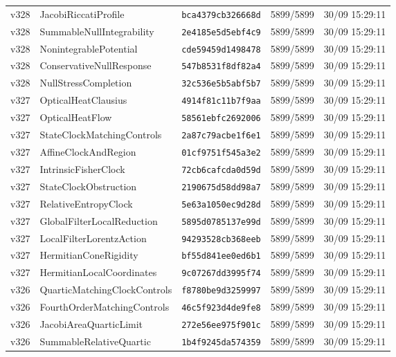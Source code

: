 \documentclass[11pt]{article}
\theoremstyle{definition}\newtheorem{deriv}{Derivação}
\begin{document}
{\begin{longtable}{@{}lllll@{}}
v328 & JacobiRiccatiProfile & \texttt{bca4379cb326668d} & 5899/5899 & 30/09 15:29:11 \\
v328 & SummableNullIntegrability & \texttt{2e4185e5d5ebf4c9} & 5899/5899 & 30/09 15:29:11 \\
v328 & NonintegrablePotential & \texttt{cde59459d1498478} & 5899/5899 & 30/09 15:29:11 \\
v328 & ConservativeNullResponse & \texttt{547b8531f8df82a4} & 5899/5899 & 30/09 15:29:11 \\
v328 & NullStressCompletion & \texttt{32c536e5b5abf5b7} & 5899/5899 & 30/09 15:29:11 \\
v327 & OpticalHeatClausius & \texttt{4914f81c11b7f9aa} & 5899/5899 & 30/09 15:29:11 \\
v327 & OpticalHeatFlow & \texttt{58561ebfc2692006} & 5899/5899 & 30/09 15:29:11 \\
v327 & StateClockMatchingControls & \texttt{2a87c79acbe1f6e1} & 5899/5899 & 30/09 15:29:11 \\
v327 & AffineClockAndRegion & \texttt{01cf9751f545a3e2} & 5899/5899 & 30/09 15:29:11 \\
v327 & IntrinsicFisherClock & \texttt{72cb6cafcda0d59d} & 5899/5899 & 30/09 15:29:11 \\
v327 & StateClockObstruction & \texttt{2190675d58dd98a7} & 5899/5899 & 30/09 15:29:11 \\
v327 & RelativeEntropyClock & \texttt{5e63a1050ec9d28d} & 5899/5899 & 30/09 15:29:11 \\
v327 & GlobalFilterLocalReduction & \texttt{5895d0785137e99d} & 5899/5899 & 30/09 15:29:11 \\
v327 & LocalFilterLorentzAction & \texttt{94293528cb368eeb} & 5899/5899 & 30/09 15:29:11 \\
v327 & HermitianConeRigidity & \texttt{bf55d841ee0ed6b1} & 5899/5899 & 30/09 15:29:11 \\
v327 & HermitianLocalCoordinates & \texttt{9c07267dd3995f74} & 5899/5899 & 30/09 15:29:11 \\
v326 & QuarticMatchingClockControls & \texttt{f8780be9d3259997} & 5899/5899 & 30/09 15:29:11 \\
v326 & FourthOrderMatchingControls & \texttt{46c5f923d4de9fe8} & 5899/5899 & 30/09 15:29:11 \\
v326 & JacobiAreaQuarticLimit & \texttt{272e56ee975f901c} & 5899/5899 & 30/09 15:29:11 \\
v326 & SummableRelativeQuartic & \texttt{1b4f9245da574359} & 5899/5899 & 30/09 15:29:11 \\

\end{longtable}}
\end{document}
